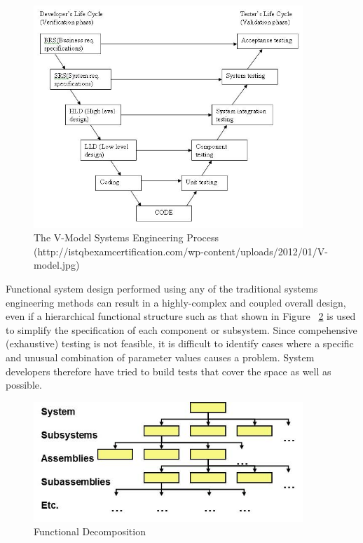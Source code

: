 \begin{figure}[h] 
\centering
   \includegraphics[width=4in]{vmodel2.jpg} 
   \caption{The V-Model Systems Engineering Process (http://istqbexamcertification.com/wp-content/uploads/2012/01/V-model.jpg)}
   \label{fig:vmodel}
\end{figure}

Functional system design performed using any of the traditional systems engineering methods
can result in a highly-complex and coupled overall design, 
even if a hierarchical functional structure such as that 
shown in Figure ~\ref{fig:functional-decomposition} is used to simplify the specification 
of each component or subsystem.  Since compehensive (exhaustive) testing is not feasible, 
it is difficult to identify cases where a specific and unusual combination of parameter values 
causes a problem.  System developers therefore have tried to build tests that cover
the space as well as possible.

\begin{figure}[h] 
\centering
   \includegraphics[width=4in]{functional-decomposition.jpg} 
   \caption{Functional Decomposition}
   \label{fig:functional-decomposition}
\end{figure}

